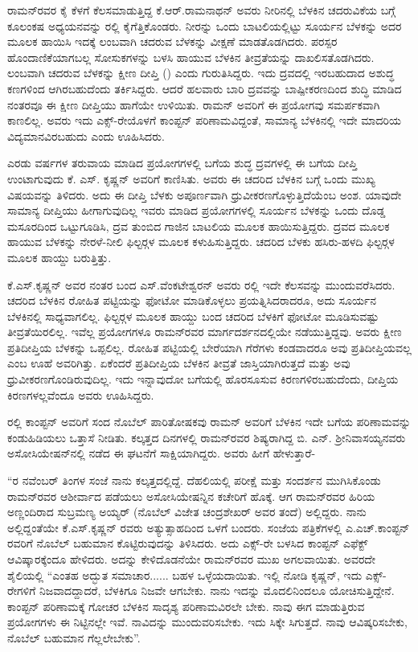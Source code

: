 ರಾಮನ್‍ರವರ ಕೈ ಕೆಳಗೆ ಕೆಲಸಮಾಡುತ್ತಿದ್ದ ಕೆ.ಆರ್.ರಾಮನಾಥನ್ ಅವರು ನೀರಿನಲ್ಲಿ ಬೆಳಕಿನ ಚದರುವಿಕೆಯ ಬಗ್ಗೆ ಕೂಲಂಕಷ ಅಧ್ಯಯನವನ್ನು ರಲ್ಲಿ ಕೈಗೆತ್ತಿಕೊಂಡರು. ನೀರನ್ನು ಒಂದು ಬಾಟಲಿಯಲ್ಲಿಟ್ಟು ಸೂರ್ಯನ ಬೆಳಕನ್ನು ಅದರ ಮೂಲಕ ಹಾಯಿಸಿ ಇದಕ್ಕೆ ಲಂಬವಾಗಿ ಚದರುವ ಬೆಳಕನ್ನು ವೀಕ್ಷಣೆ ಮಾಡತೊಡಗಿದರು. ಪರಸ್ಪರ ಹೊಂದಾಣಿಕೆಯಾಗಬಲ್ಲ ಸೋಸುಕಗಳನ್ನು ಬಳಸಿ ಹಾಯುವ ಬೆಳಕಿನ ತೀವ್ರತೆಯನ್ನು ದಾಖಲಿಸತೊಡಗಿದರು. ಲಂಬವಾಗಿ ಚದರುವ ಬೆಳಕನ್ನು ಕ್ಷೀಣ ದೀಪ್ತಿ () ಎಂದು ಗುರುತಿಸಿದ್ದರು. ಇದು ದ್ರವದಲ್ಲಿ ಇರಬಹುದಾದ ಅಶುದ್ಧ ಕಣಗಳಿಂದ ಆಗಿರಬಹುದೆಂದು ತರ್ಕಿಸಿದ್ದರು. ಆದರೆ ಹಲವಾರು ಬಾರಿ ದ್ರವವನ್ನು ಬಾಷ್ಪೀಕರಣದಿಂದ ಶುದ್ಧಿ ಮಾಡಿದ ನಂತರವೂ ಈ ಕ್ಷೀಣ ದೀಪ್ತಿಯು ಹಾಗೆಯೇ ಉಳಿಯಿತು. ರಾಮನ್ ಅವರಿಗೆ ಈ ಪ್ರಯೋಗವು ಸಮರ್ಪಕವಾಗಿ ಕಾಣಲಿಲ್ಲ. ಅವರು ಇದು ಎಕ್ಸ್-ರೇಯೊಳಗೆ ಕಾಂಪ್ಟನ್ ಪರಿಣಾಮವಿದ್ದಂತೆ, ಸಾಮಾನ್ಯ ಬೆಳಕಿನಲ್ಲಿ ಇದೇ ಮಾದರಿಯ ವಿದ್ಯಮಾನವಿರಬಹುದು ಎಂದು ಊಹಿಸಿದರು.

ಎರಡು ವರ್ಷಗಳ ತರುವಾಯ ಮಾಡಿದ ಪ್ರಯೋಗಗಳಲ್ಲಿ  ಬಗೆಯ ಶುದ್ಧ ದ್ರವಗಳಲ್ಲಿ ಈ ಬಗೆಯ ದೀಪ್ತಿ ಉಂಟಾಗುವುದು ಕೆ. ಎಸ್. ಕೃಷ್ಣನ್ ಅವರಿಗೆ ಕಾಣಿಸಿತು. ಅವರು ಈ ಚದರಿದ ಬೆಳಕಿನ ಬಗ್ಗೆ ಒಂದು ಮುಖ್ಯ ವಿಷಯವನ್ನು ತಿಳಿದರು. ಅದು ಈ ದೀಪ್ತಿ ಬೆಳಕು ಅಪೂರ್ಣವಾಗಿ ಧ್ರುವೀಕರಣಗೊಳ್ಳುತ್ತಿದೆಯೆಂಬ ಅಂಶ. ಯಾವುದೇ ಸಾಮಾನ್ಯ ದೀಪ್ತಿಯು ಹೀಗಾಗುವುದಿಲ್ಲ ಇವರು ಮಾಡಿದ ಪ್ರಯೋಗಗಳಲ್ಲಿ ಸೂರ್ಯನ ಬೆಳಕನ್ನು ಒಂದು ದೊಡ್ಡ ಮಸೂರದಿಂದ ಒಟ್ಟುಗೂಡಿಸಿ, ದ್ರವ ತುಂಬಿದ ಗಾಜಿನ ಬಾಟಲಿಯ ಮೂಲಕ ಹಾಯಿಸುತ್ತಿದ್ದರು. ದ್ರವದ ಮೂಲಕ ಹಾಯುವ ಬೆಳಕನ್ನು ನೇರಳೆ-ನೀಲಿ ಫಿಲ್ಟರ್‍ಗಳ ಮೂಲಕ ಕಳುಹಿಸುತ್ತಿದ್ದರು. ಚದರಿದ ಬೆಳಕು ಹಸಿರು-ಹಳದಿ ಫಿಲ್ಟರ್‍ಗಳ ಮೂಲಕ ಹಾಯ್ದು ಬರುತ್ತಿತ್ತು.

ಕೆ.ಎಸ್.ಕೃಷ್ಣನ್ ಅವರ ನಂತರ ಬಂದ ಎಸ್.ವೆಂಕಟೇಶ್ವರನ್ ಅವರು ರಲ್ಲಿ ಇದೇ ಕೆಲಸವನ್ನು ಮುಂದುವರೆಸಿದರು. ಚದರಿದ ಬೆಳಕಿನ ರೋಹಿತ ಪಟ್ಟಿಯನ್ನು ಫೋಟೋ ಮಾಡಿಕೊಳ್ಳಲು ಪ್ರಯತ್ನಿಸಿದರಾದರೂ, ಅದು ಸೂರ್ಯನ ಬೆಳಕಿನಲ್ಲಿ ಸಾಧ್ಯವಾಗಲಿಲ್ಲ. ಫಿಲ್ಟರ್‍ಗಳ ಮೂಲಕ ಹಾಯ್ದು ಬಂದ ಚದರಿದ ಬೆಳಕಿಗೆ ಫೋಟೋ ಮೂಡಿಸುವಷ್ಟು ತೀವ್ರತೆಯಿರಲಿಲ್ಲ. ಇವೆಲ್ಲ ಪ್ರಯೋಗಗಳೂ ರಾಮನ್‍ರವರ ಮಾರ್ಗದರ್ಶನದಲ್ಲಿಯೇ ನಡೆಯುತ್ತಿದ್ದವು. ಅವರು ಕ್ಷೀಣ ಪ್ರತಿದೀಪ್ತಿಯ ಬೆಳಕನ್ನು ಒಪ್ಪಲಿಲ್ಲ. ರೋಹಿತ ಪಟ್ಟಿಯಲ್ಲಿ ಬೇರೆಯಾಗಿ ಗೆರೆಗಳು ಕಂಡವಾದರೂ ಅವು ಪ್ರತಿದೀಪ್ತಿಯವಲ್ಲ ಎಂಬ ಊಹೆ ಅವರಿಗಿತ್ತು. ಏಕೆಂದರೆ ಪ್ರತಿದೀಪ್ತಿಯ ಬೆಳಕಿನ ತೀವ್ರತೆ ಜಾಸ್ತಿಯಾಗಿರುತ್ತದೆ ಮತ್ತು ಅವು ಧ್ರುವೀಕರಣಗೊಂಡಿರುವುದಿಲ್ಲ. ಇದು ಇನ್ನಾವುದೋ ಬಗೆಯಲ್ಲಿ ಹೊರಸೂಸುವ ಕಿರಣಗಳಿರಬಹುದೆಂದು, ದೀಪ್ತಿಯ ಕಿರಣಗಳಲ್ಲವೆಂದೂ ಅವರು ಊಹಿಸಿದ್ದರು.

ರಲ್ಲಿ ಕಾಂಪ್ಟನ್ ಅವರಿಗೆ ಸಂದ ನೊಬೆಲ್ ಪಾರಿತೋಷಕವು ರಾಮನ್ ಅವರಿಗೆ ಬೆಳಕಿನ ಇದೇ ಬಗೆಯ ಪರಿಣಾಮವನ್ನು ಕಂಡುಹಿಡಿಯಲು ಒತ್ತಾಸೆ ನೀಡಿತು. ಕಲ್ಕತ್ತದ ದಿನಗಳಲ್ಲಿ ರಾಮನ್‍ರವರ ಶಿಷ್ಯರಾಗಿದ್ದ ಬಿ. ಎನ್. ಶ‍್ರೀನಿವಾಸಯ್ಯನವರು ಅಸೋಸಿಯೇಷನ್‍ನಲ್ಲಿ ನಡೆದ ಈ ಘಟನೆಗೆ ಸಾಕ್ಷಿಯಾಗಿದ್ದರು. ಅವರು ಹೀಗೆ ಹೇಳುತ್ತಾರೆ-

“ರ ನವೆಂಬರ್ ತಿಂಗಳ ಸಂಜೆ ನಾನು ಕಲ್ಕತ್ತದಲ್ಲಿದ್ದೆ. ದೆಹಲಿಯಲ್ಲಿ ಪರೀಕ್ಷೆ ಮತ್ತು ಸಂದರ್ಶನ ಮುಗಿಸಿಕೊಂಡು ರಾಮನ್‍ರವರ ಆಶೀರ್ವಾದ ಪಡೆಯಲು ಅಸೋಸಿಯೇಷನ್ನಿನ ಕಚೇರಿಗೆ ಹೊಕ್ಕೆ. ಆಗ ರಾಮನ್‍ರವರ ಹಿರಿಯ ಅಣ್ಣಂದಿರಾದ ಸುಬ್ರಮಣ್ಯ ಅಯ್ಯರ್ (ನೊಬೆಲ್ ವಿಜೇತ ಚಂದ್ರಶೇಖರ್ ಅವರ ತಂದೆ) ಅಲ್ಲಿದ್ದರು. ನಾನು ಅಲ್ಲಿದ್ದಂತೆಯೇ ಕೆ.ಎಸ್.ಕೃಷ್ಣನ್ ರವರು ಅತ್ಯುತ್ಸಾಹದಿಂದ ಒಳಗೆ ಬಂದರು. ಸಂಜೆಯ ಪತ್ರಿಕೆಗಳಲ್ಲಿ ಎ.ಎಚ್.ಕಾಂಪ್ಟನ್ ರವರಿಗೆ ನೊಬೆಲ್ ಬಹುಮಾನ ಕೊಟ್ಟಿರುವುದನ್ನು ತಿಳಿಸಿದರು. ಅದು ಎಕ್ಸ್-ರೇ ಬಳಸಿದ ಕಾಂಪ್ಟನ್ ಎಫೆಕ್ಟ್ ಆವಿಷ್ಕಾರಕ್ಕೆಂದೂ ಹೇಳಿದರು. ಅದನ್ನು ಕೇಳಿದೊಡನೆಯೇ ರಾಮನ್‍ರವರ ಮುಖ ಅಗಲವಾಯಿತು. ಅವರದೇ ಶೈಲಿಯಲ್ಲಿ “ಎಂತಹ ಅದ್ಭುತ ಸಮಾಚಾರ...... ಬಹಳ ಒಳ್ಳೆಯದಾಯಿತು. ಇಲ್ಲಿ ನೋಡಿ ಕೃಷ್ಣನ್, ಇದು ಎಕ್ಸ್-ರೇಗಳಿಗೆ ನಿಜವಾದದ್ದಾದರೆ, ಬೆಳಕಿಗೂ ನಿಜವೇ ಆಗಬೇಕು. ನಾನು ಇದನ್ನು ಮೊದಲಿನಿಂದಲೂ ಯೋಚಿಸುತ್ತಿದ್ದೇನೆ. ಕಾಂಪ್ಟನ್ ಪರಿಣಾಮಕ್ಕೆ ಗೋಚರ ಬೆಳಕಿನ ಸಾದೃಶ್ಯ ಪರಿಣಾಮವಿರಲೇ ಬೇಕು. ನಾವು ಈಗ ಮಾಡುತ್ತಿರುವ ಪ್ರಯೋಗಗಳು ಈ ನಿಟ್ಟಿನಲ್ಲೇ ಇವೆ. ನಾವಿದನ್ನು ಮುಂದುವರಿಸಬೇಕು. ಇದು ಸಿಕ್ಕೇ ಸಿಗುತ್ತದೆ. ನಾವು ಆವಿಷ್ಕರಿಸಬೇಕು, ನೊಬೆಲ್ ಬಹುಮಾನ ಗೆಲ್ಲಲೇಬೇಕು”.

